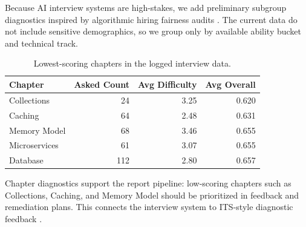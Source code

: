 ﻿\documentclass[final,3p,times,authoryear]{elsarticle}
\begin{document}
\noindent Because AI interview systems are high-stakes, we add preliminary subgroup diagnostics inspired by algorithmic hiring fairness audits \cite{kumar2022fairness}. The current data do not include sensitive demographics, so we group only by available ability bucket and technical track.

\begin{table}[H]
\centering
\caption{Selected subgroup diagnostics. Generated by \texttt{calc\_extended\_experiments.py}.}
\label{tab:subgroup_diagnostics}
\end{table}

\begin{table}[H]
\centering
\caption{Lowest-scoring chapters in the logged interview data.}
\label{tab:chapter_diagnostics}
\begin{tabular}{lrrr}
\toprule
\textbf{Chapter} & \textbf{Asked Count} & \textbf{Avg Difficulty} & \textbf{Avg Overall} \\
\midrule
Collections & 24 & 3.25 & 0.620 \\
Caching & 64 & 2.48 & 0.631 \\
Memory Model & 68 & 3.46 & 0.655 \\
Microservices & 61 & 3.07 & 0.655 \\
Database & 112 & 2.80 & 0.657 \\
\bottomrule
\end{tabular}
\end{table}

\noindent Chapter diagnostics support the report pipeline: low-scoring chapters such as Collections, Caching, and Memory Model should be prioritized in feedback and remediation plans. This connects the interview system to ITS-style diagnostic feedback \cite{vanlehn2011relative}.
\end{document}
